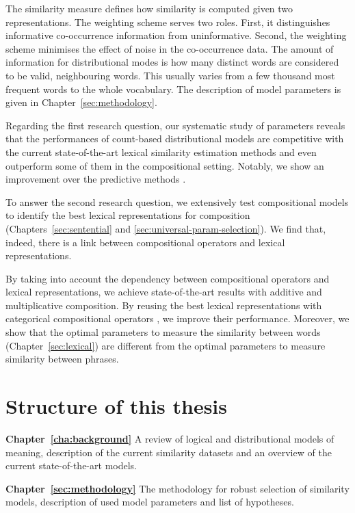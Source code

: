 The similarity measure defines how similarity is computed given two representations. The weighting scheme serves two roles. First, it distinguishes informative co-occurrence information from uninformative. Second, the weighting scheme minimises the effect of noise in the co-occurrence data. The amount of information for distributional modes is how many distinct words are considered to be valid, neighbouring words. This usually varies from a few thousand most frequent words to the whole vocabulary.  The description of model parameters is given in Chapter~\ref{sec:methodology}.

Regarding the first research question, our systematic study of parameters reveals that the performances of count-based distributional models are competitive with the current state-of-the-art lexical similarity estimation methods and even outperform some of them in the compositional setting. Notably, we show an improvement over the predictive methods \cite{mikolov2013linguistic,mikolov2013distributed,mikolov2013efficient}.

To answer the second research question, we extensively test compositional models to identify the best lexical representations for composition (Chapters~\ref{sec:sentential} and \ref{sec:universal-param-selection}). We find that, indeed, there is a link between compositional operators and lexical representations.

By taking into account the dependency between compositional operators and lexical representations,  we achieve state-of-the-art results with additive and multiplicative composition. By reusing the best lexical representations with categorical compositional operators \cite{DBLP:journals/corr/abs-1003-4394}, we improve their performance. Moreover, we show that the optimal parameters to measure the similarity between words (Chapter~\ref{sec:lexical}) are different from the optimal parameters to measure similarity between phrases.

\section{Structure of this thesis}
\label{sec:structure}

\textbf{Chapter~\ref{cha:background}} A review of logical and distributional models of meaning, description of the current similarity datasets and an overview of the current state-of-the-art models.

\textbf{Chapter~\ref{sec:methodology}} The methodology for robust selection of similarity models, description of used model parameters and list of hypotheses.

